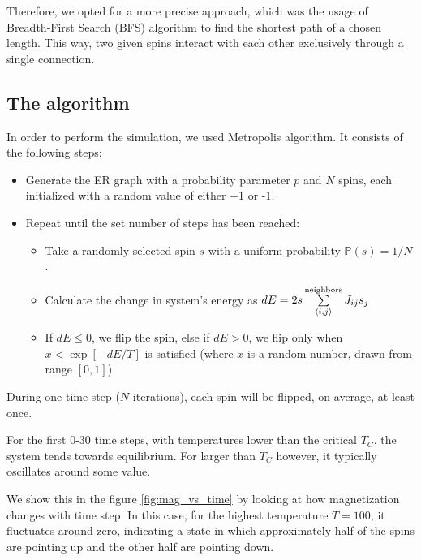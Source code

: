 \documentclass[11pt,a4paper]{article}
\begin{document}
Therefore, we opted for a more precise approach, which was the usage of Breadth-First Search (BFS) algorithm to find the shortest path of a chosen length. This way, two given spins interact with each other exclusively through a single connection.

\subsection{The algorithm}

In order to perform the simulation, we used Metropolis algorithm. It consists of the following steps:
\begin{itemize}
\item Generate the ER graph with a probability parameter $p$ and $N$ spins, each initialized with a random value of either +1 or -1.
\item Repeat until the set number of steps has been reached:
    \begin{itemize}
    \item Take a randomly selected spin $s$ with a uniform probability $\mathbb{P}(s)=1/N$.
    \item Calculate the change in system's energy as $dE = 2 s \sum\limits_{\braket{i,j}}^\text{neighbors} J_{ij} s_j$
    \item If $dE\leq0$, we flip the spin, else if $dE>0$, we flip only when $x < \exp[-dE/T]$ is satisfied (where $x$ is a random number, drawn from range $[0,1]$)
    \end{itemize}
\end{itemize}

During one time step ($N$ iterations), each spin will be flipped, on average, at least once.

For the first 0-30 time steps, with temperatures lower than the critical $T_C$, the system tends towards equilibrium. For larger than $T_C$ however, it typically oscillates around some value.

We show this in the figure \ref{fig:mag_vs_time} by looking at how magnetization changes with time step. In this case, for the highest temperature $T=100$, it fluctuates around zero, indicating a state in which approximately half of the spins are pointing up and the other half are pointing down.
\end{document}

